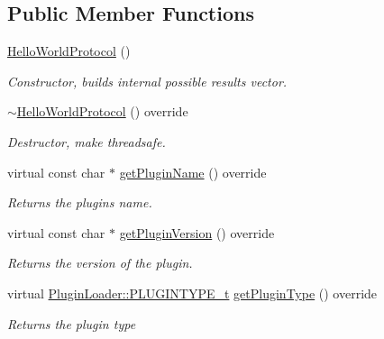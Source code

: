 \subsection*{Public Member Functions}
\begin{DoxyCompactItemize}
\item 
\mbox{\label{classhwProt_1_1HelloWorldProtocol_ad2d39bfbe2f7376f0156f73922f96740}} 
\mbox{\hyperlink{classhwProt_1_1HelloWorldProtocol_ad2d39bfbe2f7376f0156f73922f96740}{Hello\+World\+Protocol}} ()
\begin{DoxyCompactList}\small\item\em Constructor, builds internal possible results vector. \end{DoxyCompactList}\item 
\mbox{\label{classhwProt_1_1HelloWorldProtocol_aa5cbbf4de80704d96ba07b38d8cc18f5}} 
\mbox{\hyperlink{classhwProt_1_1HelloWorldProtocol_aa5cbbf4de80704d96ba07b38d8cc18f5}{$\sim$\+Hello\+World\+Protocol}} () override
\begin{DoxyCompactList}\small\item\em Destructor, make threadsafe. \end{DoxyCompactList}\item 
virtual const char $\ast$ \mbox{\hyperlink{classhwProt_1_1HelloWorldProtocol_acca6465073e5919a7a74b8f74e869e8e}{get\+Plugin\+Name}} () override
\begin{DoxyCompactList}\small\item\em Returns the plugins name. \end{DoxyCompactList}\item 
virtual const char $\ast$ \mbox{\hyperlink{classhwProt_1_1HelloWorldProtocol_ab4c559084de5fa090d75672eff462841}{get\+Plugin\+Version}} () override
\begin{DoxyCompactList}\small\item\em Returns the version of the plugin. \end{DoxyCompactList}\item 
virtual \mbox{\hyperlink{namespacePluginLoader_a7b1358e9577b47b5d4b16231a5a81699}{Plugin\+Loader\+::\+P\+L\+U\+G\+I\+N\+T\+Y\+P\+E\+\_\+t}} \mbox{\hyperlink{classhwProt_1_1HelloWorldProtocol_aa3a9c97bcf934fa61cd69e19b93a2689}{get\+Plugin\+Type}} () override
\begin{DoxyCompactList}\small\item\em Returns the plugin {\itshape type} \end{DoxyCompactList}\item 

\end{DoxyCompactItemize}
